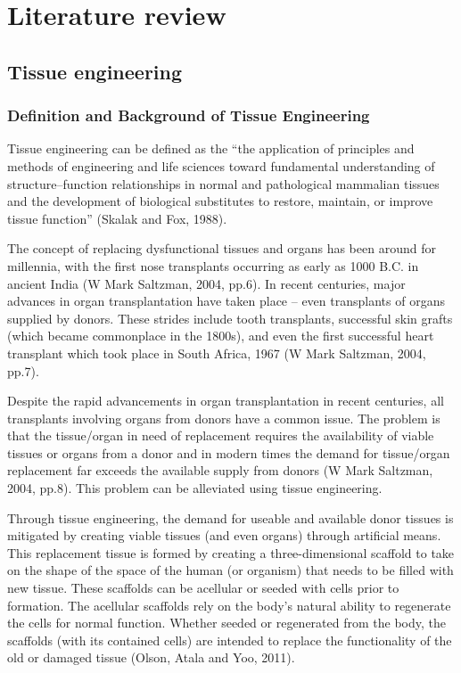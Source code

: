 \chapter{Literature review}

\section{Tissue engineering}
\subsection{Definition and Background of Tissue Engineering}
Tissue engineering can be defined as the “the application of principles and methods of engineering and life sciences toward fundamental understanding of structure–function relationships in normal and pathological mammalian tissues and the development of biological substitutes to restore, maintain, or improve tissue function” (Skalak and Fox, 1988).

The concept of replacing dysfunctional tissues and organs has been around for millennia, with the first nose transplants occurring as early as 1000 B.C. in ancient India (W Mark Saltzman, 2004, pp.6). In recent centuries, major advances in organ transplantation have taken place – even transplants of organs supplied by donors. These strides include tooth transplants, successful skin grafts (which became commonplace in the 1800s), and even the first successful heart transplant which took place in South Africa, 1967 (W Mark Saltzman, 2004, pp.7).

Despite the rapid advancements in organ transplantation in recent centuries, all transplants involving organs from donors have a common issue. The problem is that the tissue/organ in need of replacement requires the availability of viable tissues or organs from a donor and in modern times the demand for tissue/organ replacement far exceeds the available supply from donors (W Mark Saltzman, 2004, pp.8). This problem can be alleviated using tissue engineering. 

Through tissue engineering, the demand for useable and available donor tissues is mitigated by creating viable tissues (and even organs) through artificial means. This replacement tissue is formed by creating a three-dimensional scaffold to take on the shape of the space of the human (or organism) that needs to be filled with new tissue. These scaffolds can be acellular or seeded with cells prior to formation. The acellular scaffolds rely on the body’s natural ability to regenerate the cells for normal function. Whether seeded or regenerated from the body, the scaffolds (with its contained cells) are intended to replace the functionality of the old or damaged tissue (Olson, Atala and Yoo, 2011).

